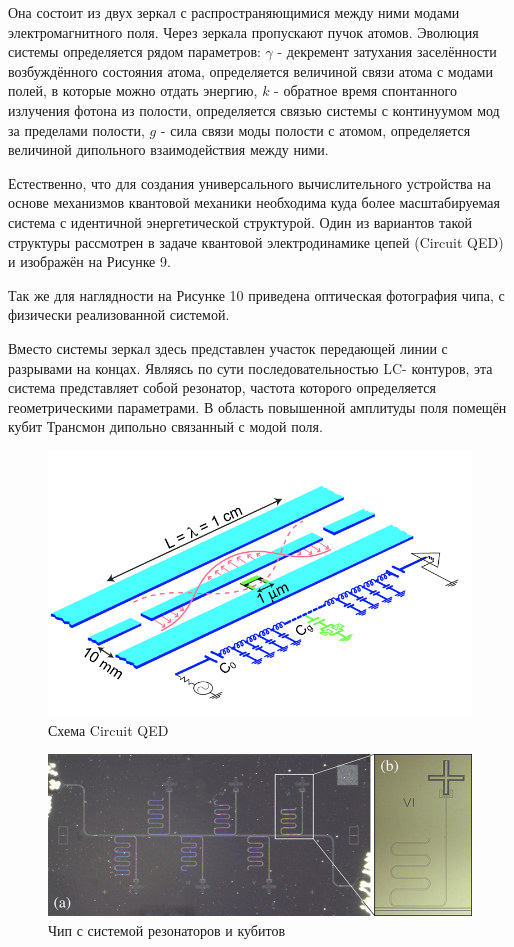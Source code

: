 Она состоит из двух зеркал с распространяющимися между ними модами электромагнитного поля. Через зеркала пропускают пучок атомов. Эволюция системы определяется рядом параметров: $\gamma$ - декремент затухания заселённости возбуждённого состояния атома, определяется величиной связи атома с модами полей, в которые можно отдать энергию, $k$ - обратное время спонтанного излучения фотона из полости, определяется связью системы с континуумом мод за пределами полости, $g$ - сила связи моды полости с атомом, определяется величиной дипольного взаимодействия между ними. 

Естественно, что для создания универсального вычислительного устройства на основе механизмов квантовой механики необходима куда более масштабируемая система с идентичной энергетической структурой. Один из вариантов такой структуры рассмотрен в задаче квантовой электродинамике цепей (Circuit QED) и  изображён на  Рисунке 9.

Так же для наглядности на Рисунке 10 приведена оптическая фотография чипа, с физически реализованной системой.

Вместо системы зеркал здесь представлен участок передающей линии с разрывами на концах. Являясь по сути последовательностью LC- контуров, эта система представляет собой резонатор, частота которого определяется геометрическими параметрами. В область повышенной амплитуды поля помещён кубит Трансмон дипольно связанный с модой поля.


\begin{figure}[!h]
	\centering
	\includegraphics[width=0.5\linewidth]{pictures/qed1}
	\caption{Схема Circuit QED}
	\label{fig:qed1}
\end{figure}


\begin{figure}[h]
	\centering
	\includegraphics[width=0.5\linewidth]{pictures/chip}
	\caption{Чип с системой резонаторов и кубитов}
	\label{fig:chip}
\end{figure}


